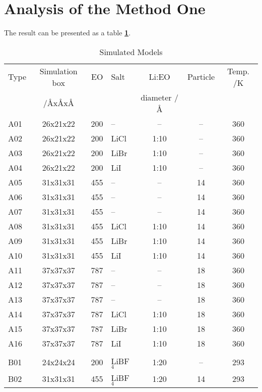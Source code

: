 \documentclass[12pt]{report}
\begin{document}
\section{Analysis of the Method One}
The result can be presented as a table \textbf{\ref{tab:models}}.
\\[5mm]
\begin{table}[h]
\caption{Simulated Models}
\label{tab:models}
\begin{center}
\begin{tabular}{l | c r l c c c}
Type & Simulation box & EO & Salt & Li:EO & Particle & Temp. /K\\
& /{\AA}x{\AA}x{\AA} & & & diameter /{\AA}\\
\hline
\hline
A01 & 26x21x22  & 200 & --         & --   & --   & 360      \\
A02 & 26x21x22  & 200 & LiCl       & 1:10 & --   & 360      \\
A03 & 26x21x22  & 200 & LiBr       & 1:10 & --   & 360      \\
A04 & 26x21x22  & 200 & LiI        & 1:10 & --   & 360      \\
A05 & 31x31x31  & 455 & --         & --   & 14   & 360      \\
A06 & 31x31x31  & 455 & --         & --   & 14   & 360      \\
A07 & 31x31x31  & 455 & --         & --   & 14   & 360      \\
A08 & 31x31x31  & 455 & LiCl       & 1:10 & 14   & 360      \\
A09 & 31x31x31  & 455 & LiBr       & 1:10 & 14   & 360      \\
A10 & 31x31x31  & 455 & LiI        & 1:10 & 14   & 360      \\
A11 & 37x37x37  & 787 & --         & --   & 18   & 360      \\
A12 & 37x37x37  & 787 & --         & --   & 18   & 360      \\
A13 & 37x37x37  & 787 & --         & --   & 18   & 360      \\
A14 & 37x37x37  & 787 & LiCl       & 1:10 & 18   & 360      \\
A15 & 37x37x37  & 787 & LiBr       & 1:10 & 18   & 360      \\
A16 & 37x37x37  & 787 & LiI        & 1:10 & 18   & 360      \\
\\
B01 & 24x24x24  & 200 & LiBF$_{4}$ & 1:20 & --   & 293      \\
B02 & 31x31x31  & 455 & LiBF$_{4}$ & 1:20 & 14   & 293      \\

\end{tabular}
\end{center}
\end{table}
\end{document}
